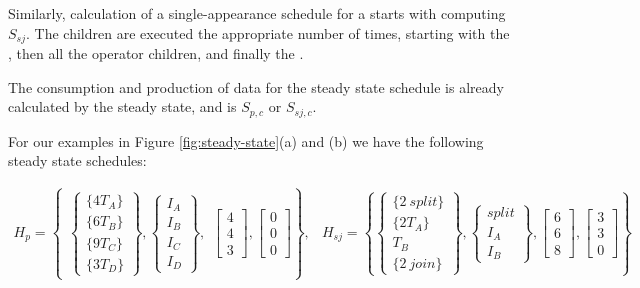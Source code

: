 Similarly, calculation of a single-appearance schedule for a
{\splitjoin} starts with computing $S_{sj}$. The children are
executed the appropriate number of times, starting with the
{\splitter}, then all the operator children, and finally the
{\joiner}.

The consumption and production of data for the steady state
schedule is already calculated by the steady state, and is
$S_{p,c}$ or $S_{sj,c}$.

For our examples in Figure \ref{fig:steady-state}(a) and (b) we
have the following steady state schedules:

\begin{displaymath}
\begin{array}{lr}
H_p = \left\{\begin{array}{l}\left\{\begin{array}{c}\{4T_A\}\\
\{6T_B\} \\ \{9T_C\}\\ \{3T_D\}\end{array}\right\}, \left\{\begin{array}{c}I_A\\
I_B\\ I_C\\ I_D\end{array}\right\},\end{array} \left[
\begin{array}{c}
4\\4\\3
\end{array}\right], \left[
\begin{array}{c}
0\\0\\0
\end{array}\right] \right\}, &
H_{sj} = \left\{\left\{\begin{array}{c}\{2\ split\}\\ \{2T_A\}
\\ T_B \\ \{2\ join\}\end{array}\right\}, \left\{\begin{array}{c}split\\I_A\\I_B\end{array}\right\},
\left[
\begin{array}{c}
6\\6\\8
\end{array}\right], \left[
\begin{array}{c}
3\\3\\0
\end{array}\right] \right\}
\end{array}
\end{displaymath}

